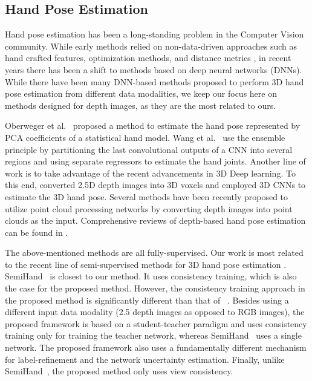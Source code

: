 \documentclass{article}
\begin{document}
\subsection{Hand Pose Estimation}
Hand pose estimation has been a long-standing problem in the Computer Vision community. While early methods relied on non-data-driven approaches such as hand crafted features, optimization methods, and distance metrics \cite{athitsos2003estimating,sharp2015accurate,oikonomidis2011efficient}, in recent years there has been a shift to methods based on deep neural networks (DNNs). While there have been many DNN-based methods proposed to perform 3D hand pose estimation from different data modalities, we keep our focus here on methods designed for depth images, as they are the most related to ours.
\par
Oberweger et al.~\cite{oberweger2015hands} proposed a method to estimate the hand pose represented by PCA coefficients of a statistical hand model. Wang et al.~\cite{wang2018region} use the ensemble principle by partitioning the last convolutional outputs of a CNN into several regions and using separate regressors to estimate the hand joints.  Another line of work is to take advantage of the recent advancements in 3D Deep learning. To this end, \cite{ge20173d,moon2018v2v} converted 2.5D depth images into 3D voxels and employed 3D CNNs to estimate the 3D hand pose. Several methods  \cite{ge2018hand,ge2018point,li2019point,chen2019so,cheng2021handfoldingnet,huang2020hand} have been recently proposed to utilize point cloud processing networks by converting depth images into point clouds as the input. Comprehensive reviews of depth-based hand pose estimation can be found in \cite{supancic2015depth,yuan2018depth}. 
\par
The above-mentioned methods are all fully-supervised. Our work is most related to the recent line of semi-supervised methods for 3D hand pose estimation \cite{chen2019so,wan2017crossing,poier2019murauer,baek2018augmented}. SemiHand~\cite{yang2021semihand} is closest to our method. It uses consistency training, which is also the case for the proposed method. However, the consistency training approach in the proposed method is significantly different than that of ~\cite{yang2021semihand}. Besides using a different input data modality (2.5 depth images as opposed to RGB images), the proposed framework is based on a student-teacher paradigm and uses consistency training only for training the teacher network, whereas SemiHand~\cite{yang2021semihand} uses a single network. The proposed framework also uses a fundamentally different mechanism for label-refinement and the network uncertainty estimation. Finally, unlike SemiHand~\cite{yang2021semihand}, the proposed method only uses view consistency.
\end{document}
